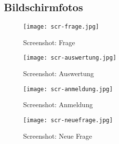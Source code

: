 \begin{appendix} 

\section{Bildschirmfotos}

\hspace{\textwidth}

\begin{figure}[h]
\texttt{[image: scr-frage.jpg]}
\caption{Screenshot: Frage}
\label{scr:frage}
\end{figure}

\begin{figure}[h]
\texttt{[image: scr-auswertung.jpg]}
\caption{Screenshot: Auswertung}
\label{scr:auswertung}
\end{figure}

\begin{figure}[h]
\texttt{[image: scr-anmeldung.jpg]}
\caption{Screenshot: Anmeldung}
\label{scr:anmeldung}
\end{figure}

\begin{figure}[h]
\texttt{[image: scr-neuefrage.jpg]}
\caption{Screenshot: Neue Frage}
\label{scr:neuefrage}
\end{figure}

\end{appendix}